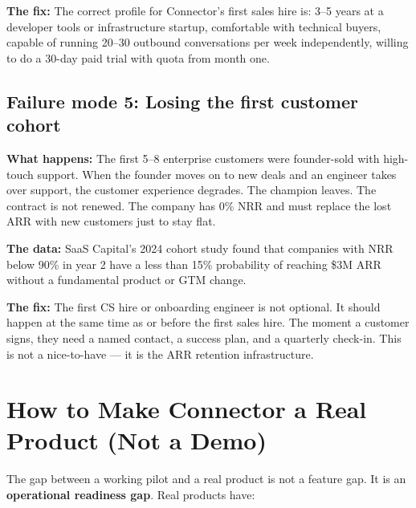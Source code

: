 \textbf{The fix:} The correct profile for Connector's first sales hire is: 3--5
years at a developer tools or infrastructure startup, comfortable with technical
buyers, capable of running 20--30 outbound conversations per week independently,
willing to do a 30-day paid trial with quota from month one.

\subsection{Failure mode 5: Losing the first customer cohort}

\textbf{What happens:} The first 5--8 enterprise customers were founder-sold
with high-touch support. When the founder moves on to new deals and an engineer
takes over support, the customer experience degrades. The champion leaves. The
contract is not renewed. The company has 0\% NRR and must replace the lost ARR
with new customers just to stay flat.

\textbf{The data:} SaaS Capital's 2024 cohort study found that companies with
NRR below 90\% in year 2 have a less than 15\% probability of reaching \$3M ARR
without a fundamental product or GTM change.

\textbf{The fix:} The first CS hire or onboarding engineer is not optional. It
should happen at the same time as or before the first sales hire. The moment a
customer signs, they need a named contact, a success plan, and a quarterly
check-in. This is not a nice-to-have — it is the ARR retention infrastructure.

\section{How to Make Connector a Real Product (Not a Demo)}

The gap between a working pilot and a real product is not a feature gap. It is
an \textbf{operational readiness gap}. Real products have:

